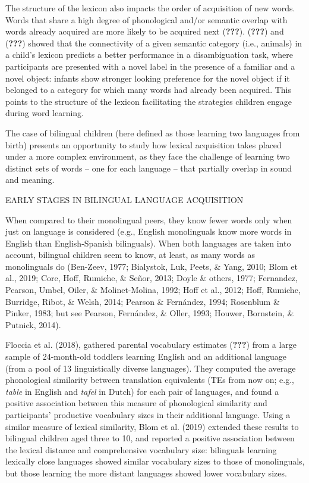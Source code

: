 \documentclass[
  english,
  man,man,floatsintext]{apa6}
\begin{document}
The structure of the lexicon also impacts the order of acquisition of new words. Words that share a high degree of phonological and/or semantic overlap with words already acquired are more likely to be acquired next ({\textbf{???}}). ({\textbf{???}}) and ({\textbf{???}}) showed that the connectivity of a given semantic category (i.e., animals) in a child's lexicon predicts a better performance in a disambiguation task, where participants are presented with a novel label in the presence of a familiar and a novel object: infants show stronger looking preference for the novel object if it belonged to a category for which many words had already been acquired. This points to the structure of the lexicon facilitating the strategies children engage during word learning.

The case of bilingual children (here defined as those learning two languages from birth) presents an opportunity to study how lexical acquisition takes placed under a more complex environment, as they face the challenge of learning two distinct sets of words -- one for each language -- that partially overlap in sound and meaning.

EARLY STAGES IN BILINGUAL LANGUAGE ACQUISITION

When compared to their monolingual peers, they know fewer words only when just on language is considered (e.g., English monolinguals know more words in English than English-Spanish bilinguals). When both languages are taken into account, bilingual children seem to know, at least, as many words as monolinguals do (Ben-Zeev, 1977; Bialystok, Luk, Peets, \& Yang, 2010; Blom et al., 2019; Core, Hoff, Rumiche, \& Señor, 2013; Doyle \& others, 1977; Fernandez, Pearson, Umbel, Oiler, \& Molinet-Molina, 1992; Hoff et al., 2012; Hoff, Rumiche, Burridge, Ribot, \& Welsh, 2014; Pearson \& Fernández, 1994; Rosenblum \& Pinker, 1983; but see Pearson, Fernández, \& Oller, 1993; Houwer, Bornstein, \& Putnick, 2014).

Floccia et al. (2018), gathered parental vocabulary estimates ({\textbf{???}}) from a large sample of 24-month-old toddlers learning English and an additional language (from a pool of 13 linguistically diverse languages). They computed the average phonological similarity between translation equivalents (TEs from now on; e.g., \emph{table} in English and \emph{tafel} in Dutch) for each pair of languages, and found a positive association between this measure of phonological similarity and participants' productive vocabulary sizes in their additional language. Using a similar measure of lexical similarity, Blom et al. (2019) extended these results to bilingual children aged three to 10, and reported a positive association between the lexical distance and comprehensive vocabulary size: bilinguals learning lexically close languages showed similar vocabulary sizes to those of monolinguals, but those learning the more distant languages showed lower vocabulary sizes.
\end{document}
